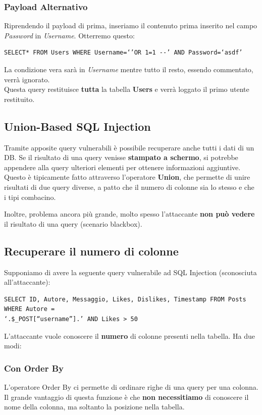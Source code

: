 \documentclass{article}
\begin{document}
\subsubsection{Payload Alternativo}
Riprendendo il payload di prima, inseriamo il contenuto prima inserito nel campo \textit{Password} in \textit{Username}. Otterremo questo:
\begin{Verbatim}
SELECT* FROM Users WHERE Username=‘’OR 1=1 --’ AND Password=‘asdf’
\end{Verbatim}

La condizione vera sarà in \textit{Username} mentre tutto il resto, essendo commentato, verrà ignorato.\\
Questa query restituisce \textbf{tutta} la tabella \textbf{Users} e verrà loggato il primo utente restituito.

\subsection{Union-Based SQL Injection}
Tramite apposite query vulnerabili è possibile recuperare anche tutti i dati di un DB. Se il risultato di una query venisse \textbf{stampato a schermo}, si potrebbe appendere alla query ulteriori elementi per ottenere informazioni aggiuntive.\\
Questo è tipicamente fatto attraverso l'operatore \textbf{Union}, che permette di unire risultati di due query diverse, a patto che il numero di colonne sia lo stesso e che i tipi combacino.

Inoltre, problema ancora più grande, molto spesso l'attaccante \textbf{non può vedere} il risultato di una query (scenario blackbox).

\subsection{Recuperare il numero di colonne}
Supponiamo di avere la seguente query vulnerabile ad SQL Injection (sconosciuta all'attaccante):
\begin{verbatim}
SELECT ID, Autore, Messaggio, Likes, Dislikes, Timestamp FROM Posts WHERE Autore =
‘.$_POST[“username”].’ AND Likes > 50 
\end{verbatim}

L'attaccante vuole conoscere il \textbf{numero} di colonne presenti nella tabella. Ha due modi:

\subsubsection{Con Order By}
L'operatore Order By ci permette di ordinare righe di una query per una colonna. Il grande vantaggio di questa funzione è che \textbf{non necessitiamo} di conoscere il nome della colonna, ma soltanto la posizione nella tabella.
\end{document}
